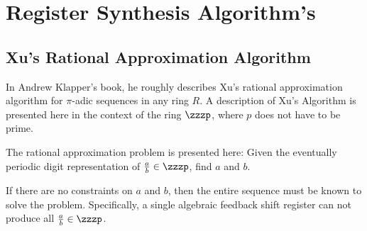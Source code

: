 \section{Register Synthesis Algorithm's}
\subsection{Xu's Rational Approximation Algorithm}
\par In Andrew Klapper's book, he roughly describes Xu's rational approximation
algorithm for $\pi$-adic sequences in any ring $R$. A description of Xu's Algorithm
is presented here in the context of the ring $\zzzp$, where $p$ does not have to be prime.

\par The rational approximation problem is presented here: Given the eventually
periodic digit representation of $\frac{a}{b}\in\zzzp$, find $a$ and $b$.

\par If there are no constraints on $a$ and $b$, then the entire sequence must be known
to solve the problem. Specifically, a single algebraic feedback shift register can
not produce all $\frac{a}{b}\in\zzzp$.
